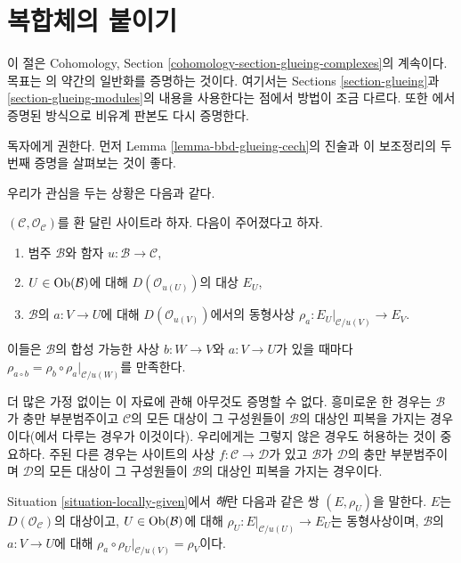 \section{복합체의 붙이기}
\label{section-glueing-complexes}

\noindent
이 절은 Cohomology, Section
\ref{cohomology-section-glueing-complexes}의 계속이다.
목표는 \cite[Theorem 3.2.4]{BBD}의 약간의 일반화를 증명하는 것이다.
여기서는 Sections \ref{section-glueing}과
\ref{section-glueing-modules}의 내용을 사용한다는 점에서 방법이
조금 다르다. 또한 \cite{six-I}에서 증명된 방식으로 비유계 판본도 다시
증명한다.

\medskip\noindent
독자에게 권한다. 먼저 Lemma \ref{lemma-bbd-glueing-cech}의 진술과
이 보조정리의 두 번째 증명을 살펴보는 것이 좋다.

\medskip\noindent
우리가 관심을 두는 상황은 다음과 같다.

\begin{situation}
\label{situation-locally-given}
$(\mathcal{C}, \mathcal{O}_\mathcal{C})$를 환 달린 사이트라 하자. 다음이
주어졌다고 하자.
\begin{enumerate}
\item 범주 $\mathcal{B}$와 함자
$u : \mathcal{B} \to \mathcal{C}$,
\item $U \in \mathop{\mathrm{Ob}}\nolimits(\mathcal{B})$에 대해 $D(\mathcal{O}_{u(U)})$의 대상 $E_U$,
\item $\mathcal{B}$의 $a : V \to U$에 대해
$D(\mathcal{O}_{u(V)})$에서의 동형사상
$\rho_a : E_U|_{\mathcal{C}/u(V)} \to E_V$.
\end{enumerate}
이들은 $\mathcal{B}$의 합성 가능한 사상
$b : W \to V$와 $a : V \to U$가 있을 때마다
$\rho_{a \circ b} = \rho_b \circ \rho_a|_{\mathcal{C}/u(W)}$를 만족한다.
\end{situation}

\noindent
더 많은 가정 없이는 이 자료에 관해 아무것도 증명할 수 없다.
흥미로운 한 경우는 $\mathcal{B}$가 충만 부분범주이고
$\mathcal{C}$의 모든 대상이 그 구성원들이 $\mathcal{B}$의 대상인
피복을 가지는 경우이다(\cite{BBD}에서 다루는 경우가 이것이다).
우리에게는 그렇지 않은 경우도 허용하는 것이 중요하다. 주된 다른 경우는
사이트의 사상 $f : \mathcal{C} \to \mathcal{D}$가 있고
$\mathcal{B}$가 $\mathcal{D}$의 충만 부분범주이며
$\mathcal{D}$의 모든 대상이 그 구성원들이 $\mathcal{B}$의 대상인
피복을 가지는 경우이다.

\medskip\noindent
Situation \ref{situation-locally-given}에서 {\it 해}란 다음과 같은 쌍
$(E, \rho_U)$을 말한다. $E$는 $D(\mathcal{O}_\mathcal{C})$의 대상이고,
$U \in \mathop{\mathrm{Ob}}\nolimits(\mathcal{B})$에 대해
$\rho_U : E|_{\mathcal{C}/u(U)} \to E_U$는 동형사상이며,
$\mathcal{B}$의 $a : V \to U$에 대해
$\rho_a \circ \rho_U|_{\mathcal{C}/u(V)} = \rho_V$이다.

